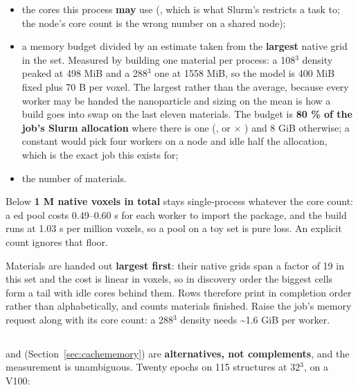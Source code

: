 \begin{itemize}
  \item the cores this process \textbf{may} use (, which is what Slurm's  restricts a task to; the node's core count is the wrong number on a shared node);
  \item a memory budget divided by an estimate taken from the \textbf{largest} native grid in the set. Measured by building one material per process: a 108$^3$ density peaked at 498 MiB and a 288$^3$ one at 1558 MiB, so the model is 400 MiB fixed plus 70 B per voxel. The largest rather than the average, because every worker may be handed the nanoparticle and sizing on the mean is how a build goes into swap on the last eleven materials. The budget is \textbf{80 \% of the job's Slurm allocation} where there is one (, or  $\times$ ) and 8 GiB otherwise; a constant would pick four workers on a  node and idle half the allocation, which is the exact job this exists for;
  \item the number of materials.
\end{itemize}

Below \textbf{1 M native voxels in total}  stays single-process whatever the core count: a ed pool costs 0.49--0.60 s for each worker to import the package, and the build runs at 1.03 s per million voxels, so a pool on a toy set is pure loss. An explicit count ignores that floor.

Materials are handed out \textbf{largest first}: their native grids span a factor of 19 in this set and the cost is linear in voxels, so in discovery order the biggest cells form a tail with idle cores behind them. Rows therefore print in completion order rather than alphabetically, and  counts materials finished. Raise the job's memory request along with its core count: a 288$^3$ density needs \textasciitilde{}1.6 GiB per worker.

\subsection{}

\label{sec:num-workers-and-pin-memory}

 and  (Section~\ref{sec:cachememory}) are \textbf{alternatives, not complements}, and the measurement is unambiguous. Twenty epochs on 115 structures at 32$^3$, on a V100:

